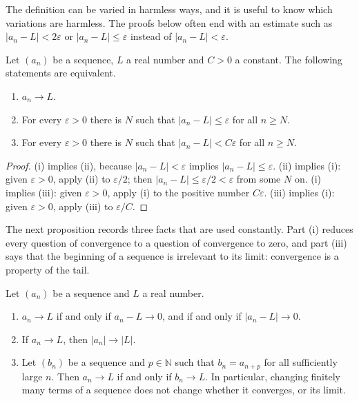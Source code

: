 The definition can be varied in harmless ways, and it is useful to know which variations are harmless. The proofs below often end with an estimate such as $|a_n-L|<2\varepsilon$ or $|a_n-L|\le\varepsilon$ instead of $|a_n-L|<\varepsilon$.

\begin{proposition}
\label{prop:limit-variants}
Let $(a_n)$ be a sequence, $L$ a real number and $C>0$ a constant. The following statements are equivalent.
\begin{enumerate}
\item $a_n\to L$.
\item For every $\varepsilon>0$ there is $N$ such that $|a_n-L|\le\varepsilon$ for all $n\ge N$.
\item For every $\varepsilon>0$ there is $N$ such that $|a_n-L|<C\varepsilon$ for all $n\ge N$.
\end{enumerate}
\end{proposition}

\begin{proof}
(i) implies (ii), because $|a_n-L|<\varepsilon$ implies $|a_n-L|\le\varepsilon$. (ii) implies (i): given $\varepsilon>0$, apply (ii) to $\varepsilon/2$; then $|a_n-L|\le\varepsilon/2<\varepsilon$ from some $N$ on. (i) implies (iii): given $\varepsilon>0$, apply (i) to the positive number $C\varepsilon$. (iii) implies (i): given $\varepsilon>0$, apply (iii) to $\varepsilon/C$.
\end{proof}

The next proposition records three facts that are used constantly. Part (i) reduces every question of convergence to a question of convergence to zero, and part (iii) says that the beginning of a sequence is irrelevant to its limit: convergence is a property of the tail.

\begin{proposition}
\label{prop:seq-basic}
Let $(a_n)$ be a sequence and $L$ a real number.
\begin{enumerate}
\item $a_n\to L$ if and only if $a_n-L\to0$, and if and only if $|a_n-L|\to0$.
\item If $a_n\to L$, then $|a_n|\to|L|$.
\item Let $(b_n)$ be a sequence and $p\in\mathbb N$ such that $b_n=a_{n+p}$ for all sufficiently large $n$. Then $a_n\to L$ if and only if $b_n\to L$. In particular, changing finitely many terms of a sequence does not change whether it converges, or its limit.
\end{enumerate}
\end{proposition}


